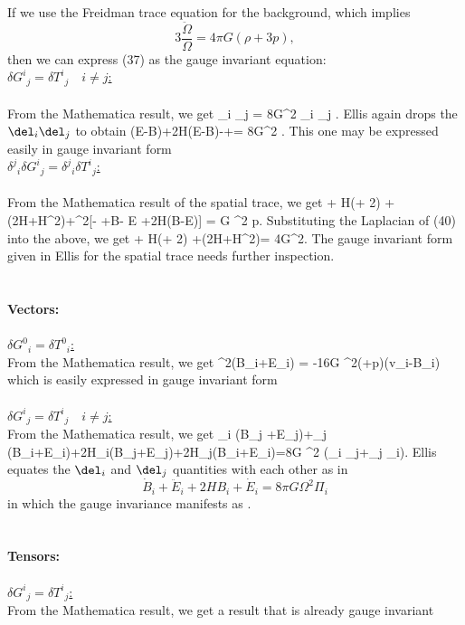 \documentclass[10pt,letterpaper]{article}
\begin{document}
\ee
If we use the Freidman trace equation for the background, which implies
\[
	3\frac{\ddot \Omega}{\Omega} = 4\pi G(\rho+3p),
\]
then we can express (37) as the gauge invariant equation:
\be
\ee
\\
\underline{$\delta G^i{}_j = \delta T^i{}_j\quad i\ne j$:}
\\ \\
From the Mathematica result, we get
\be
	\del_i \del_j = 8\pi G\Omega^2 \del_i \del_j \Pi.
\ee
Ellis again drops the $\del_i \del_j$ to obtain
\be
	 (\ddot E-\dot B)+2H(\dot E-B)-\phi+\psi= 8\pi G\Omega^2 \Pi.
\ee
This one may be expressed easily in gauge invariant form
\be
\ee
\\
\underline{$\delta^j{}_i\delta G^i{}_j = \delta^j{}_i\delta T^i{}_j$:}
\\ \\
From the Mathematica result of the spatial trace, we get
\be
	\ddot \psi + H(\dot\phi + 2\dot\psi) +(2\dot H+H^2)\phi +\del^2[\phi - \psi +\dot B- \ddot E +2H(B-\dot E)] = \pi G \Omega^2 \delta p.
\ee
Substituting the Laplacian of (40) into the above, we get 
\be
	\ddot \psi + H(\dot\phi + 2\dot\psi) +(2\dot H+H^2)\phi = 4\pi G\Omega^2.
\ee
The gauge invariant form given in Ellis for the spatial trace needs further inspection.
\\ \\ \\
\textbf{Vectors:}
\\
\\
\underline{$\delta G^0{}_i = \delta T^0{}_i$:}\\
From the Mathematica result, we get
\be
	\del^2(B_i+\dot E_i) = -16\pi G \Omega^2(\rho+p)(v_i-B_i)
\ee 
which is easily expressed in gauge invariant form
\be
\ee
\\
\\
\underline{$\delta G^i{}_j = \delta T^i{}_j\quad i\ne j$:}\\
From the Mathematica result, we get
\be
	\del_i (\dot B_j +\ddot E_j)+\del_j (\dot B_i+\ddot E_i)+2H\del_i(B_j+\dot E_j)+2H\del_j(B_i+\dot E_i)=8\pi G \Omega^2 (\del_i \Pi_j+\del_j \Pi_i).
\ee
Ellis equates the $\del_i$ and $\del_j$ quantities with each other as in
\[
	\dot B_i+\ddot E_i + 2H B_i+\dot E_i = 8\pi G\Omega^2 \Pi_i
\]
in which the gauge invariance manifests as
\be
	.
\ee
\\ \\ \\
\textbf{Tensors:}
\\
\\
\underline{$\delta G^i{}_j = \delta T^i{}_j$:}\\
From the Mathematica result, we get a result that is already gauge invariant
\be
\ee
\\ \\ \\ \\
\end{document}
